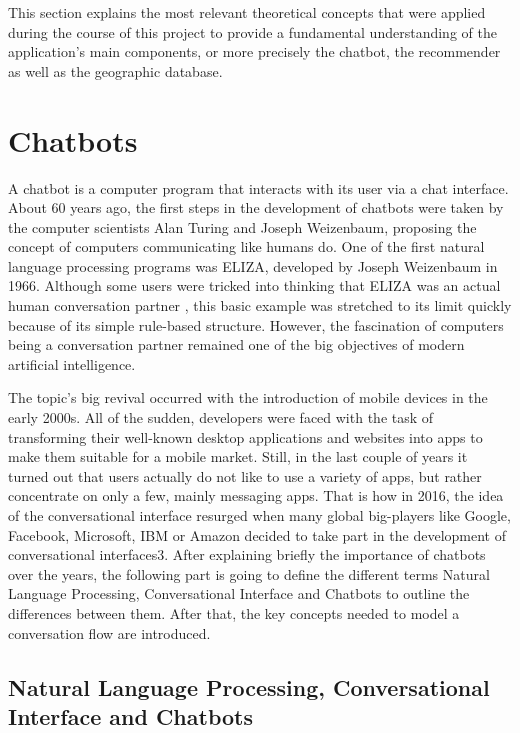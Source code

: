 

This section explains the most relevant theoretical concepts that were applied during the course of this project to provide a fundamental understanding of the application’s main components, or more precisely the chatbot, the recommender as well as the geographic database. 

\section{Chatbots}
A chatbot is a computer program that interacts with its user via a chat interface. About 60 years ago, the first steps in the development of chatbots were taken by the computer scientists Alan Turing and Joseph Weizenbaum, proposing the concept of computers communicating like humans do. One of the first natural language processing programs was ELIZA, developed by Joseph Weizenbaum in 1966. Although some users were tricked into thinking that ELIZA was an actual human conversation partner \cite{weizenbaum66}, this basic example was stretched to its limit quickly because of its simple rule-based structure. However, the fascination of computers being a conversation partner remained one of the big objectives of modern artificial intelligence.

The topic’s big revival occurred with the introduction of mobile devices in the early 2000s. All of the sudden, developers were faced with the task of transforming their well-known desktop applications and websites into apps to make them suitable for a mobile market. Still, in the last couple of years it turned out that users actually do not like to use a variety of apps, but rather concentrate on only a few, mainly messaging apps. That is how in 2016, the idea of the conversational interface resurged when many global big-players like Google, Facebook, Microsoft, IBM or Amazon decided to take part in the development of conversational interfaces3. 
After explaining briefly the importance of chatbots over the years, the following part is going to define the different terms Natural Language Processing, Conversational Interface and Chatbots to outline the differences between them. After that, the key concepts needed to model a conversation flow are introduced.


\subsection{Natural Language Processing, Conversational Interface and Chatbots}


